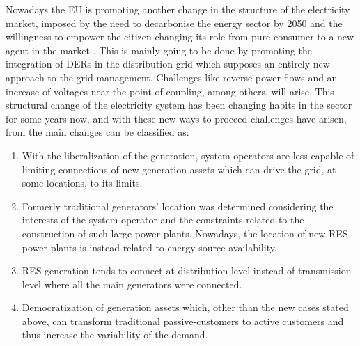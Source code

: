 Nowadays the EU is promoting another change in the structure of the electricity market, imposed by the need to decarbonise the energy sector by 2050 and the willingness to empower the citizen changing its role from pure consumer to a new agent in the market \cite{Hancher2017}. This is mainly going to be done by promoting the integration of DERs in the distribution grid which supposes an entirely new approach to the grid management. Challenges like reverse power flows and an increase of voltages near the point of coupling, among others, will arise. This structural change of the electricity system has been changing habits in the sector for some years now, and with these new ways to proceed challenges have arisen, from \cite{Bollen2011} the main changes can be classified as:

\begin{enumerate}
\item With the liberalization of the generation, system operators are less capable of limiting
connections of new generation assets which can drive the grid, at some locations, to its
limits.
\item Formerly traditional generators' location was determined considering the interests of the system
operator and the constraints related to the construction of such large power plants.
Nowadays, the location of new RES power plants is instead related to energy source availability.
\item RES generation tends to connect at distribution level instead of transmission level where
all the main generators were connected.
\item Democratization of generation assets which, other than the new cases stated above, can
transform traditional passive-customers to active customers and thus increase the variability
of the demand.

\end{enumerate}

